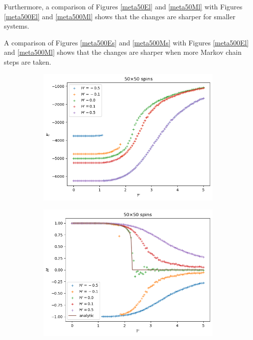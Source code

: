 \documentclass[11pt]{article}
\begin{document}
Furthermore, a comparison of Figures \ref{meta50El} and \ref{meta50Ml} with Figures \ref{meta500El} and \ref{meta500Ml} shows that the changes are sharper for smaller systems.

A comparison of Figures \ref{meta500Es} and \ref{meta500Ms} with Figures \ref{meta500El} and \ref{meta500Ml} shows that the changes are sharper when more Markov chain steps are taken.



\begin{figure}[H]
    \centering
    \begin{subfigure}[H]{0.48\textwidth}
        \centering
        \includegraphics[width=\textwidth]{Meta/energy_N50_steps100000-10000000-2000000_Hsteps1000000.png}
        \caption{}
        \label{meta50Es}
    \end{subfigure}
    \hfill
    \centering
    \begin{subfigure}[H]{0.48\textwidth}
        \centering
        \includegraphics[width=\textwidth]{Meta/magnetization_N50_steps100000-10000000-2000000_Hsteps1000000.png}
        \caption{}
        \label{meta50Ms}
    \end{subfigure}


\end{figure}
\end{document}
